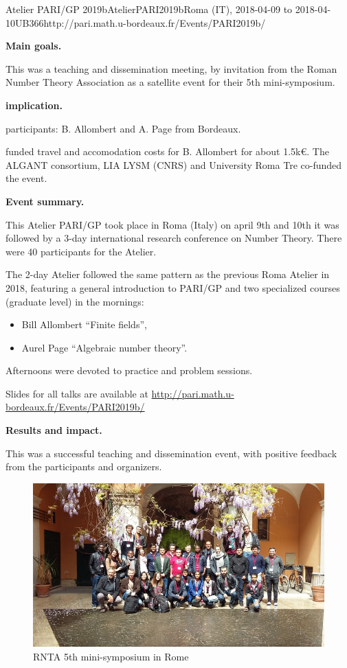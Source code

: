 \begin{event}{Atelier PARI/GP 2019b}{AtelierPARI2019b}{Roma (IT),
2018-04-09 to 2018-04-10}{UB}{36}{6}{http://pari.math.u-bordeaux.fr/Events/PARI2019b/}

\textbf{Main goals.}

This was a teaching and dissemination meeting, by invitation from the Roman
  Number Theory Association as a satellite event for their 5th
  mini-symposium.

\textbf{\ODK implication.}

\ODK participants: B. Allombert and A. Page from Bordeaux.

\ODK funded travel and accomodation costs for B. Allombert for about
  1.5k\euro. The ALGANT consortium, LIA LYSM (CNRS) and University Roma Tre
  co-funded the event.

\textbf{Event summary.}

This Atelier PARI/GP took place in Roma (Italy) on april 9th and 10th
it was followed by a 3-day international research conference on
Number Theory. There were 40 participants for the Atelier.

The 2-day Atelier followed the same pattern as the previous Roma Atelier
in 2018,
featuring a general introduction to PARI/GP and two
  specialized courses (graduate level) in the mornings:
\begin{itemize}
\item Bill Allombert ``Finite fields'',
\item Aurel Page ``Algebraic number theory''.
\end{itemize}
Afternoons were devoted to practice and problem sessions.

Slides for all talks are available at
\url{http://pari.math.u-bordeaux.fr/Events/PARI2019b/}

\textbf{Results and impact.}

This was a successful teaching and dissemination event, with positive
feedback from the participants and organizers.

\begin{figure}[ht]
  \includegraphics[scale=0.5]{pari2019b.jpg}
\caption*{RNTA 5th mini-symposium in Rome}
\end{figure}
\end{event}
